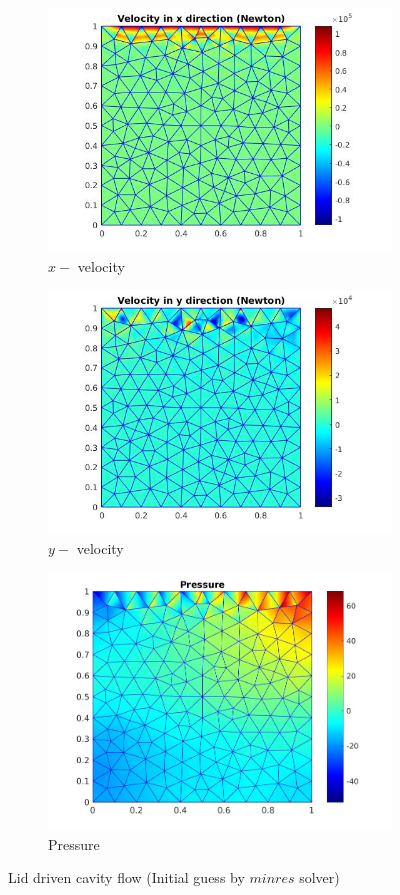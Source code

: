\documentclass[a4paper,twoside,openright]{book}
\begin{document}
\begin{figure}
  \begin{subfigure}{\textwidth}
    \includegraphics[width=0.8\linewidth]{lid_newton_vx_minres.jpg}
    \caption{$x-$ velocity}
  \label{x_vel_navier_stoke_minres_lid}
  \end{subfigure}
  \begin{subfigure}{\textwidth}
    \includegraphics[width=0.8\linewidth]{lid_newton_vy_minres.jpg}
    \caption{$y-$ velocity}
  \label{y_vel_navier_stoke_minres_lid}
  \end{subfigure}
  \begin{subfigure}{\textwidth}
    \includegraphics[width=0.8\linewidth]{lid_newton_pressure_minres.jpg}
    \caption{Pressure}
  \label{pressure_navier_stoke_minres_lid}
  \end{subfigure}
\caption{Lid driven cavity flow (Initial guess by $minres$ solver)}
\label{lid_driven_cavity_n_s_minres}
\end{figure}
\end{document}
